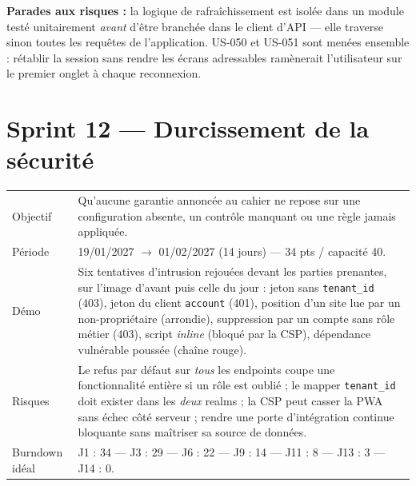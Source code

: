\textbf{Parades aux risques :} la logique de rafraîchissement est isolée dans un
module testé unitairement \emph{avant} d'être branchée dans le client d'API ---
elle traverse sinon toutes les requêtes de l'application. US-050 et US-051 sont
menées ensemble : rétablir la session sans rendre les écrans adressables
ramènerait l'utilisateur sur le premier onglet à chaque reconnexion.

\section{Sprint 12 --- Durcissement de la sécurité}

\begin{center}
\begin{tabular}{lp{11cm}}
\toprule
Objectif  & Qu'aucune garantie annoncée au cahier ne repose sur une
            configuration absente, un contrôle manquant ou une règle jamais
            appliquée. \\
Période   & 19/01/2027 $\rightarrow$ 01/02/2027 (14 jours) --- 34 pts / capacité 40. \\
Démo      & Six tentatives d'intrusion rejouées devant les parties prenantes,
            sur l'image d'avant puis celle du jour : jeton sans
            \texttt{tenant\_id} (403), jeton du client \texttt{account} (401),
            position d'un site lue par un non-propriétaire (arrondie),
            suppression par un compte sans rôle métier (403), script
            \emph{inline} (bloqué par la CSP), dépendance vulnérable poussée
            (chaîne rouge). \\
Risques   & Le refus par défaut sur \emph{tous} les endpoints coupe une
            fonctionnalité entière si un rôle est oublié ; le mapper
            \texttt{tenant\_id} doit exister dans les \emph{deux} realms ; la
            CSP peut casser la PWA sans échec côté serveur ; rendre une porte
            d'intégration continue bloquante sans maîtriser sa source de
            données. \\
Burndown idéal & J1 : 34 --- J3 : 29 --- J6 : 22 --- J9 : 14 --- J11 : 8 --- J13 : 3 --- J14 : 0. \\
\bottomrule
\end{tabular}
\end{center}

